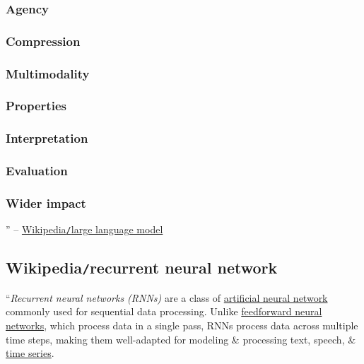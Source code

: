 \documentclass{article}
\begin{document}
\subsubsection{Agency}

\subsubsection{Compression}

\subsubsection{Multimodality}

\subsubsection{Properties}

\subsubsection{Interpretation}

\subsubsection{Evaluation}

\subsubsection{Wider impact}

'' -- \href{https://en.wikipedia.org/wiki/Large_language_model}{Wikipedia{\tt/}large language model}


\subsection{Wikipedia{\tt/}recurrent neural network}
``{\it Recurrent neural networks (RNNs)} are a class of \href{https://en.wikipedia.org/wiki/Neural_network_(machine_learning)}{artificial neural network} commonly used for sequential data processing. Unlike \href{https://en.wikipedia.org/wiki/Feedforward_neural_network}{feedforward neural networks}, which process data in a single pass, RNNs process data across multiple time steps, making them well-adapted for modeling \& processing text, speech, \& \href{https://en.wikipedia.org/wiki/Time_series}{time series}.
\end{document}
